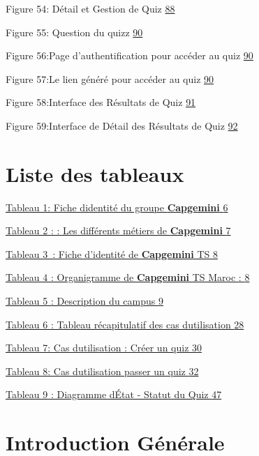 \documentclass[12pt,a4paper,twoside]{report}
\begin{document}
Figure 54: Détail et Gestion de Quiz
\protect\hyperlink{_Toc203823464}{88}

Figure 55: Question du quizz \protect\hyperlink{_Toc203823465}{90}

Figure 56:Page d'authentification pour accéder au quiz
\protect\hyperlink{_Toc203823466}{90}

Figure 57:Le lien généré pour accéder au quiz
\protect\hyperlink{_Toc203823467}{90}

Figure 58:Interface des Résultats de Quiz
\protect\hyperlink{_Toc203823468}{91}

Figure 59:Interface de Détail des Résultats de Quiz
\protect\hyperlink{_Toc203823469}{92}

\hypertarget{liste-des-tableaux}{%
\section{Liste des tableaux}\label{liste-des-tableaux}}

\protect\hyperlink{_Toc203823475}{Tableau 1: Fiche
d\textquotesingle identité du groupe \textbf{Capgemini}
\protect\hyperlink{_Toc203823475}{6}}

\protect\hyperlink{_Toc203823476}{Tableau 2 : : Les différents métiers
de \textbf{Capgemini} \protect\hyperlink{_Toc203823476}{7}}

\protect\hyperlink{_Toc203823477}{Tableau 3~: Fiche d'identité de
\textbf{Capgemini} TS \protect\hyperlink{_Toc203823477}{8}}

\protect\hyperlink{_Toc203823478}{Tableau 4 : Organigramme de
\textbf{Capgemini} TS Maroc : \protect\hyperlink{_Toc203823478}{8}}

\protect\hyperlink{_Toc203823479}{Tableau 5 : Description du campus
\protect\hyperlink{_Toc203823479}{9}}

\protect\hyperlink{_Toc203823480}{Tableau 6 : Tableau récapitulatif des
cas d\textquotesingle utilisation \protect\hyperlink{_Toc203823480}{28}}

\protect\hyperlink{_Toc203823481}{Tableau 7: Cas
d\textquotesingle utilisation : Créer un quiz
\protect\hyperlink{_Toc203823481}{30}}

\protect\hyperlink{_Toc203823482}{Tableau 8: Cas
d\textquotesingle utilisation passer un quiz
\protect\hyperlink{_Toc203823482}{32}}

\protect\hyperlink{_Toc203823483}{Tableau 9 : Diagramme
d\textquotesingle État - Statut du Quiz
\protect\hyperlink{_Toc203823483}{47}}

\hypertarget{introduction-guxe9nuxe9rale}{%
\section{Introduction Générale}\label{introduction-guxe9nuxe9rale}}
\end{document}
